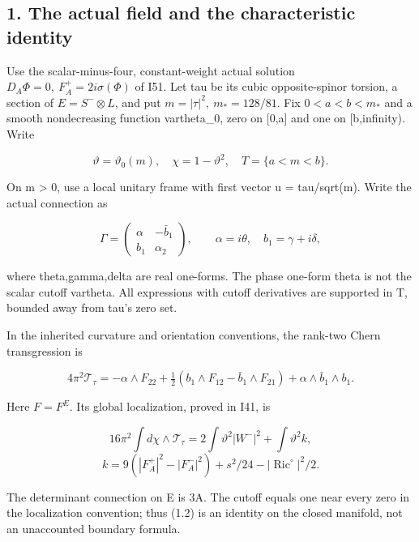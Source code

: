 \documentclass[
  10pt,
]{article}
\begin{document}
\hypertarget{the-actual-field-and-the-characteristic-identity}{%
\subsection{1. The actual field and the characteristic
identity}\label{the-actual-field-and-the-characteristic-identity}}

Use the scalar-minus-four, constant-weight actual solution
\(D_A\Phi=0,\ F_A^+=2i\sigma(\Phi)\) of I51. Let tau be its cubic
opposite-spinor torsion, a section of \(E=S^-\otimes L\), and put
\(m=|\tau|^2,\ m_*=128/81\). Fix \(0<a<b<m_*\) and a smooth
nondecreasing function vartheta\_0, zero on {[}0,a{]} and one on
{[}b,infinity). Write

\[
 \vartheta=\vartheta_0(m),\quad \chi=1-\vartheta^2,\quad
                         T=\{a<m<b\}.
\]

On m \textgreater{} 0, use a local unitary frame with first vector u =
tau/sqrt(m). Write the actual connection as

\[
 \Gamma=\begin{pmatrix}\alpha&-\bar b_1\\b_1&\alpha_2\end{pmatrix},
 \qquad \alpha=i\theta,\quad b_1=\gamma+i\delta,
\]

where theta,gamma,delta are real one-forms. The phase one-form theta is
not the scalar cutoff vartheta. All expressions with cutoff derivatives
are supported in T, bounded away from tau's zero set.

In the inherited curvature and orientation conventions, the rank-two
Chern transgression is

\[
 4\pi^2\mathcal T_\tau
 =-\alpha\wedge F_{22}
 +\tfrac12(b_1\wedge F_{12}-\bar b_1\wedge F_{21})
                         +\alpha\wedge\bar b_1\wedge b_1.
                                                               \tag{1.1}
\]

Here \(F=F^E\). Its global localization, proved in I41, is

\[
 16\pi^2\int d\chi\wedge\mathcal T_\tau
           =2\int\vartheta^2|W^-|^2+\int\vartheta^2 k,
                                                               \tag{1.2}
\] \[
 k=9(|F_A^+|^2-|F_A^-|^2)+s^2/24-|\operatorname{Ric}^{\circ}|^2/2.
\]

The determinant connection on E is 3A. The cutoff equals one near every
zero in the localization convention; thus (1.2) is an identity on the
closed manifold, not an unaccounted boundary formula.
\end{document}
